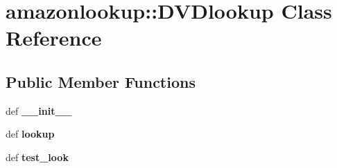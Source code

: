 \hypertarget{classamazonlookup_1_1DVDlookup}{
\section{amazonlookup::DVDlookup Class Reference}
\label{classamazonlookup_1_1DVDlookup}
}
\subsection*{Public Member Functions}
\begin{DoxyCompactItemize}
\item 
\hypertarget{classamazonlookup_1_1DVDlookup_ad05f35a964567373ae1ab25fc7f1d37e}{
def {\bfseries \_\-\_\-init\_\-\_\-}}
\label{classamazonlookup_1_1DVDlookup_ad05f35a964567373ae1ab25fc7f1d37e}

\item 
\hypertarget{classamazonlookup_1_1DVDlookup_a6a6d5aecb2d5aff0ed2ceee932ea5e5c}{
def {\bfseries lookup}}
\label{classamazonlookup_1_1DVDlookup_a6a6d5aecb2d5aff0ed2ceee932ea5e5c}

\item 
\hypertarget{classamazonlookup_1_1DVDlookup_a61a64f034443d0a851d5af7589119222}{
def {\bfseries test\_\-look}}
\label{classamazonlookup_1_1DVDlookup_a61a64f034443d0a851d5af7589119222}

\end{DoxyCompactItemize}
